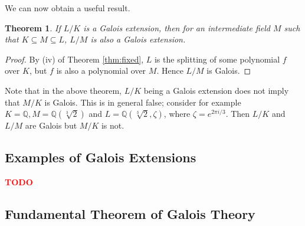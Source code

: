 \documentclass[12pt]{article}
\newtheorem{theorem}{Theorem}
\theoremstyle{definition}
\newtheorem{definition}[theorem]{Definition}
\newcommand{\Aut}{\operatorname{Aut}}
\newcommand{\Fix}{\operatorname{Fix}}
\newcommand{\Q}{\mathbb Q}
\newcommand{\TODO}{\textbf{\textcolor{red}{TODO}}}
\begin{document}
We can now obtain a useful result.

\begin{theorem} \label{thm:galois-intermediate}
	If $L/K$ is a Galois extension, then for an intermediate field $M$ such that $K \subseteq M \subseteq L$, $L/M$ is also a Galois extension. 
\end{theorem}
\begin{proof}
	By (iv) of Theorem \ref{thm:fixed}, $L$ is the splitting of some polynomial $f$ over $K$, but $f$ is also a polynomial over $M$. Hence $L/M$ is Galois.
\end{proof}

Note that in the above theorem, $L/K$ being a Galois extension does not imply that $M/K$ is Galois. This is in general false; consider for example $K = \Q, M = \Q(\sqrt[3]{2})$ and $L = \Q(\sqrt[3]{2}, \zeta)$, where $\zeta = e^{2\pi i / 3}$. Then $L/K$ and $L/M$ are Galois but $M/K$ is not. 


\subsection{Examples of Galois Extensions}

\TODO

\subsection{Fundamental Theorem of Galois Theory}

%
%
%
\end{document}
